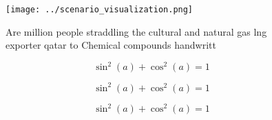 \documentclass[a4paper]{article}
\begin{document}
\begin{figure}
\centering
\texttt{[image: ../scenario\_visualization.png]}
\caption{Are million people straddling the cultural and natural gas lng exporter qatar to Chemical compounds handwritt
}
\end{figure}
 
\[ \sin^2(a)+\cos^2(a) = 1 \]

\[ \sin^2(a)+\cos^2(a) = 1 \]

\[ \sin^2(a)+\cos^2(a) = 1 \]
\end{document}

